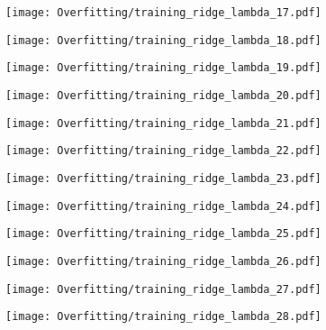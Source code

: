 \documentclass[xcolor=pdftex,dvipsnames,table]{beamer}
\begin{document}
\frame
{
	\begin{center}
		\texttt{[image: Overfitting/training\_ridge\_lambda\_17.pdf]}
	\end{center}
}

\frame
{
	\begin{center}
		\texttt{[image: Overfitting/training\_ridge\_lambda\_18.pdf]}
	\end{center}
}

\frame
{
	\begin{center}
		\texttt{[image: Overfitting/training\_ridge\_lambda\_19.pdf]}
	\end{center}
}

\frame
{
	\begin{center}
		\texttt{[image: Overfitting/training\_ridge\_lambda\_20.pdf]}
	\end{center}
}

\frame
{
	\begin{center}
		\texttt{[image: Overfitting/training\_ridge\_lambda\_21.pdf]}
	\end{center}
}

\frame
{
	\begin{center}
		\texttt{[image: Overfitting/training\_ridge\_lambda\_22.pdf]}
	\end{center}
}

\frame
{
	\begin{center}
		\texttt{[image: Overfitting/training\_ridge\_lambda\_23.pdf]}
	\end{center}
}

\frame
{
	\begin{center}
		\texttt{[image: Overfitting/training\_ridge\_lambda\_24.pdf]}
	\end{center}
}

\frame
{
	\begin{center}
		\texttt{[image: Overfitting/training\_ridge\_lambda\_25.pdf]}
	\end{center}
}

\frame
{
	\begin{center}
		\texttt{[image: Overfitting/training\_ridge\_lambda\_26.pdf]}
	\end{center}
}

\frame
{
	\begin{center}
		\texttt{[image: Overfitting/training\_ridge\_lambda\_27.pdf]}
	\end{center}
}

\frame
{
	\begin{center}
		\texttt{[image: Overfitting/training\_ridge\_lambda\_28.pdf]}
	\end{center}
}
\end{document}
